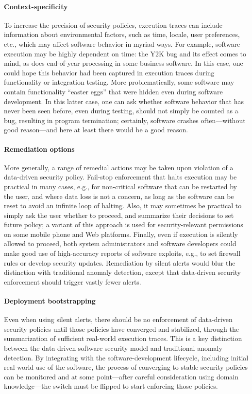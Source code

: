 \documentclass{IEEEtran}
\begin{document}
\paragraph*{Context-specificity}
To increase the precision of security policies,
execution traces can
include information about environmental factors,
such as time, locale, user preferences, etc.,
which may affect software behavior in myriad ways.
For example,
software execution may be highly dependent on time:
the Y2K bug and its effect comes to mind,
as does end-of-year processing in some business software.
In this case,
one could hope this behavior had been
captured in execution traces during functionality or integration testing.
More problematically, some software may contain functionality ``easter eggs''
that were hidden even during software development.
In this latter case,
one can ask whether software behavior that has never been seen before, even during testing,
should not simply be counted as a bug, resulting in program termination;
certainly, software crashes often---without good reason---and here at least there would be a good reason.


\paragraph*{Remediation options}
More generally,
a range of remedial actions may be taken 
upon violation of a data-driven security policy.
Fail-stop enforcement that halts execution
may be practical in many cases,
e.g., for non-critical software that can be restarted by the user,
and where data loss is not a concern,
as long as the software can be reset to avoid an infinite loop of halting.
Also,
it may sometimes be practical to simply ask the user whether to proceed,
and summarize their decisions to set future policy;
a variant of this approach is used for security-relevant permissions on some mobile phone and Web platforms.
Finally,
even if execution is silently allowed to proceed,
both system administrators and software developers
could make good use of high-accuracy reports of software exploits,
e.g., to set firewall rules or develop security updates.
Remediation by silent alerts would blur the distinction
with traditional anomaly detection,
except that data-driven security enforcement
should trigger vastly fewer alerts.


\paragraph*{Deployment bootstrapping}
Even when using silent alerts,
there should be no enforcement of
data-driven security policies
until
those policies have converged and stabilized,
through the summarization of sufficient real-world execution traces.
This is a key 
distinction between
the data-driven software security model
and traditional anomaly detection.
By integrating with the software-development lifecycle,
including initial real-world use of the software,
the process of converging to stable security policies 
can be monitored
and at some point---after careful consideration using domain knowledge---the
switch must be flipped to start enforcing those policies.
\end{document}
